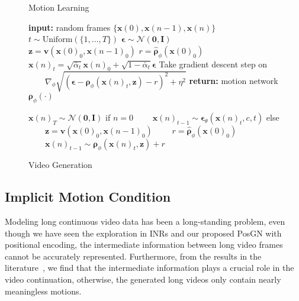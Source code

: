\documentclass[letterpaper]{article}
\newcommand{\grad}{\nabla}
\newcommand{\bI}{\mathbf{I}}
\newcommand{\bzero}{\mathbf{0}}
\newcommand{\bx}{\mathbf{x}}
\newcommand{\bz}{\mathbf{z}}
\newcommand{\bepsilon}{{\boldsymbol{\epsilon}}}
\newcommand{\brho}{{\boldsymbol{\rho}}}
\begin{document}
\algrenewcommand\algorithmicindent{0.5em}\begin{figure}[t]
\begin{minipage}[t]{0.495\textwidth}
\begin{algorithm}[H]
  \caption{Motion Learning} \label{alg:training}
  \label{algo}
  \small
  \begin{algorithmic}[1]
    \State \textbf{input:} random frames $\{\bx(0), \bx(n-1), \bx(n)\}$ 
    \Repeat
      \State $t \sim \mathrm{Uniform}(\{1, \dotsc, T\})$
      \State $\bepsilon\sim\mathcal{N}(\bzero,\bI)$
      \State $\bz = \mathbf{v} (\bx(0)_0, \bx(n-1)_0)$
      \State $r = \hat\brho_\phi (\bx(0)_0)$
      \State $\bx(n)_t = \sqrt{\bar\alpha_t} \bx(n)_0 + \sqrt{1-\bar\alpha_t}\bepsilon$
      \State Take gradient descent step on
      \Statex $\qquad \grad_\phi \sqrt{(\bepsilon - \brho_\phi(\bx(n)_t, \bz) - r)^2 + \eta^2}$
    \State \textbf{return:} motion network $\brho_\phi(\cdot)$
  \end{algorithmic}
\end{algorithm}
\end{minipage}
\hfill
\begin{minipage}[t]{0.495\textwidth}
\begin{algorithm}[H]
  \caption{Video Generation} \label{alg:sampling}
  \small
  \begin{algorithmic}[1]
    \State $\bx(n)_T \sim \mathcal{N}(\bzero, \bI)$
      \State if $n = 0$
      \Statex $\qquad \bx(n)_{t-1} \sim \bepsilon_\theta(\bx(n)_t, c, t)$
      \State else
      \Statex $\qquad \bz = \mathbf{v} (\bx(0)_0, \bx(n-1)_0)$ 
      \Statex $\qquad r = \hat\brho_\phi (\bx(0)_0)$
      \Statex $\qquad \bx(n)_{t-1} \sim \brho_\phi(\bx(n)_t, \bz) + r$
    \EndFor
    \EndFor
    \vspace{.06in}
  \end{algorithmic}
\end{algorithm}
\end{minipage}
\vspace{-1\baselineskip}
\end{figure}


\subsection{Implicit Motion Condition}
Modeling long continuous video data has been a long-standing problem, even though we have seen the exploration in INRs and our proposed PosGN with positional encoding, the intermediate information between long video frames cannot be accurately represented.
Furthermore, from the results in the literature~\cite{yu2022generating,skorokhodov2021stylegan}, we find that the intermediate information plays a crucial role in the video continuation, otherwise, the generated long videos only contain nearly meaningless motions.
\end{document}
